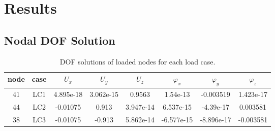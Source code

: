 \documentclass{article}%
\begin{document}
%
\section{Results}%
\label{sec:Results}%

%
\subsection{Nodal DOF Solution}%
\label{subsec:NodalDOFSolution}%
\begin{table}[h!]\centering%
\begin{tabular}{| c c | c c c c c c |}%
\hline%
node&case&$U_x$&$U_y$&$U_z$&$\varphi_x$&$\varphi_y$&$\varphi_z$\\%
\hline%
\hline%
41&LC1&4.895e{-}18&3.062e{-}15&0.9563&1.54e{-}13&{-}0.003519&1.423e{-}17\\%
44&LC2&{-}0.01075&0.913&3.947e{-}14&6.537e{-}15&{-}4.39e{-}17&0.003581\\%
38&LC3&{-}0.01075&{-}0.913&5.862e{-}14&{-}6.577e{-}15&{-}8.896e{-}17&{-}0.003581\\%
\hline%
\end{tabular}%
\caption{DOF solutions of loaded nodes for each load case.}\label{table:tbl-dofsol}\end{table}%
\end{document}
